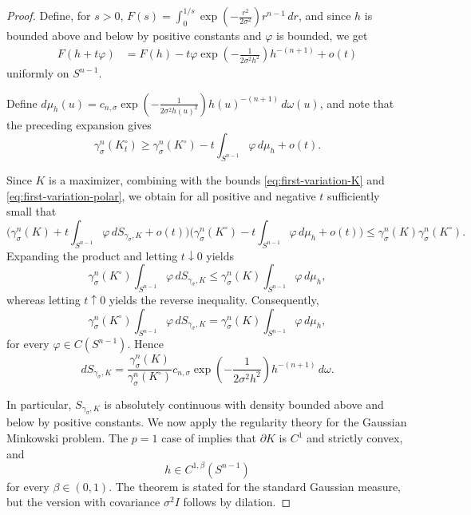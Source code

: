 \documentclass[12pt,oneside,reqno]{amsart}
\numberwithin{equation}{section}
\theoremstyle{remark}
\begin{document}
\begin{proof}
Define, for \(s>0\), $F(s) = \int_0^{1/s}
        \exp\left(-\frac{r^2}{2\sigma^2}\right)
        r^{n-1}\,dr$, and since \(h\) is bounded above and below by positive constants and \(\varphi\) is bounded, we get 
\[
\begin{aligned}
    F(h+t\varphi)
    &=
    F(h)
    -
    t\varphi
    \exp\left(-\frac{1}{2\sigma^2h^2}\right)
    h^{-(n+1)}
    +o(t)
\end{aligned}
\]
uniformly on \( S^{n-1}\).

Define  $d\mu_h(u)=c_{n,\sigma}
    \exp\left(-\frac{1}{2\sigma^2h(u)^2}\right) h(u)^{-(n+1)}\,d\omega(u)$, and  note that the preceding expansion gives
\begin{equation}
\label{eq:first-variation-polar}
    \gamma_\sigma^n(K_t^\circ)
    \ge \gamma_\sigma^n(K^\circ)- t\int_{ S^{n-1}}\varphi\,d\mu_h
    +o(t).
\end{equation}

Since \(K\) is a maximizer, combining with the bounds
\eqref{eq:first-variation-K} and
\eqref{eq:first-variation-polar}, we obtain for all positive and negative \(t\) sufficiently small that
\[
    \bigl(\gamma_\sigma^n(K)+t\int_{ S^{n-1}} \varphi\,dS_{\gamma_\sigma,K}+o(t)\bigr)
    \bigl(\gamma_\sigma^n(K^\circ)-t\int_{ S^{n-1}}
        \varphi\,d\mu_h+o(t)\bigr)
    \le \gamma_\sigma^n(K)\gamma_\sigma^n(K^\circ).
\]
Expanding the product and letting \(t\downarrow0\) yields
\[
    \gamma_\sigma^n(K^\circ) \int_{ S^{n-1}}  \varphi\,dS_{\gamma_\sigma,K} \le \gamma_\sigma^n(K)\int_{ S^{n-1}}   \varphi\,d\mu_h,
\]
whereas letting \(t\uparrow0\) yields the reverse inequality.
Consequently,
\[
    \gamma_\sigma^n(K^\circ) \int_{S^{n-1}}  \varphi\,dS_{\gamma_\sigma,K} = \gamma_\sigma^n(K)\int_{ S^{n-1}}   \varphi\,d\mu_h,
\]
for every \(\varphi\in C( S^{n-1})\). Hence
\begin{equation}
\label{eq:weak-Euler}
      dS_{\gamma_\sigma,K}
    =
      \frac{\gamma_\sigma^n(K)}{\gamma_\sigma^n(K^\circ) }  c_{n,\sigma}
    \exp\left(-\frac{1}{2\sigma^2h^2}\right)
    h^{-(n+1)}\,d\omega.
\end{equation}


In particular, \(S_{\gamma_\sigma,K}\) is absolutely continuous with density 
bounded above and below by positive constants. We now apply the regularity theory for the Gaussian Minkowski problem. The \(p=1\) case of
\cite[Theorem 3.1]{feng2023lp} implies that
\(\partial K\) is \(C^1\) and strictly convex, and 
\[
    h\in C^{1,\beta}( S^{n-1})
\]
for every \(\beta\in(0,1)\). The theorem is stated for
the standard Gaussian measure, but the version with covariance
\(\sigma^2I\) follows by dilation.



\end{proof}
\end{document}

